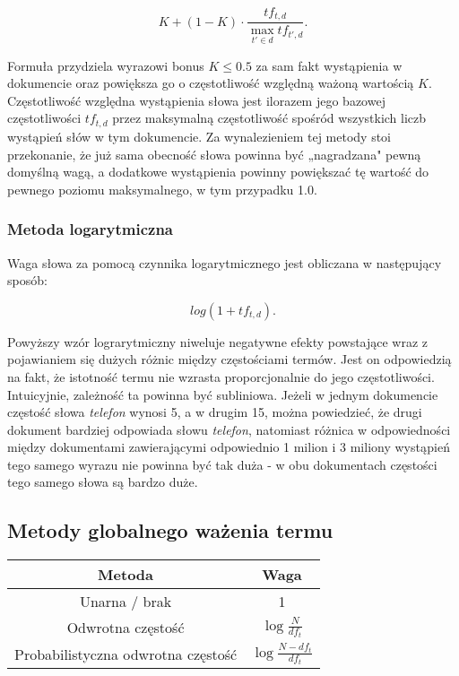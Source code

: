 \documentclass{pracamgr}
\begin{document}
\[
K + (1 - K) \cdot \frac{tf_{t,d}}{\max_{t' \in d} tf_{t',d}}.
\]

Formuła przydziela wyrazowi bonus $K \leq 0.5$ za sam fakt wystąpienia w dokumencie oraz powiększa go o częstotliwość względną ważoną wartością $K$. Częstotliwość względna wystąpienia słowa jest ilorazem jego bazowej częstotliwości $tf_{t,d}$ przez maksymalną częstotliwość spośród wszystkich liczb wystąpień słów w tym dokumencie. Za wynalezieniem tej metody stoi przekonanie, że już sama obecność słowa powinna być „nagradzana" pewną domyślną wagą, a dodatkowe wystąpienia powinny powiększać tę wartość do pewnego poziomu maksymalnego, w tym przypadku 1.0.

\subsubsection*{Metoda logarytmiczna}
Waga słowa za pomocą czynnika logarytmicznego jest obliczana w następujący sposób:

\[
log(1 + tf_{t,d}).
\]

Powyższy wzór lograrytmiczny niweluje negatywne efekty powstające wraz z pojawianiem się dużych różnic między częstościami termów. Jest on odpowiedzią na fakt, że istotność termu nie wzrasta proporcjonalnie do jego częstotliwości. Intuicyjnie, zależność ta powinna być subliniowa. Jeżeli w jednym dokumencie częstość słowa \textit{telefon} wynosi 5, a w drugim 15, można powiedzieć, że drugi dokument bardziej odpowiada słowu \textit{telefon}, natomiast różnica w odpowiedności między dokumentami zawierającymi odpowiednio 1 milion i 3 miliony wystąpień tego samego wyrazu nie powinna być tak duża - w obu dokumentach częstości tego samego słowa są bardzo duże.

\subsection{Metody globalnego ważenia termu}
\vspace{3mm}

\begin{tabular}{|c|c|}
     Metoda & Waga \\ \hline
     Unarna / brak & 1 \\[0.25cm] 
     Odwrotna częstość & $ \log\displaystyle\frac{N}{df_t} $ \\[0.25cm]
     Probabilistyczna odwrotna częstość & $ \log\displaystyle\frac{N - df_t}{df_t} $ \\
\end{tabular}
\vspace{5mm}
\end{document}

